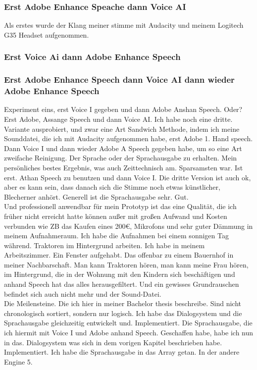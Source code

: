 \documentclass[10pt,a4paper,bibliography=totocnumbered,listof=totocnumbered]{scrartcl}
\begin{document}
\subsubsection{Erst Adobe Enhance Speache dann Voice AI}
Als erstes wurde der Klang meiner stimme mit Audacity und meinem Logitech G35 Headset aufgenommen.
\subsubsection{Erst Voice Ai dann Adobe Enhance Speech}
\subsubsection{Erst Adobe Enhance Speech dann Voice AI dann wieder Adobe Enhance Speech}
 
Experiment eins, erst Voice I gegeben und dann Adobe Anshan Speech. 		 Oder? Erst Adobe, Assange Speech und dann Voice AI.  Ich habe noch eine dritte.
\\
Variante ausprobiert, und zwar eine Art Sandwich Methode, indem ich meine Sounddatei, die ich mit Audacity aufgenommen habe, erst Adobe 1. Hand speech. Dann Voice I und dann wieder Adobe A Speech gegeben habe, um so eine Art zweifache Reinigung. Der Sprache oder der Sprachausgabe zu erhalten.     Mein persönliches bestes Ergebnis, was auch Zeittechnisch am. Sparsamsten war.  Ist erst.  Athan Speech zu benutzen und dann Voice I. Die dritte Version ist auch ok, aber es kann sein, dass danach sich die Stimme noch etwas künstlicher, Blecherner anhört.   Generell ist die Sprachausgabe sehr.  Gut.
\\
Und professionell anwendbar für mein Prototyp ist das eine Qualität, die ich früher nicht erreicht hatte können außer mit großen Aufwand und Kosten verbunden wie ZB das Kaufen eines 200€, Mikrofons und sehr guter Dämmung in meinem Aufnahmeraum. Ich habe die Aufnahmen bei einem sonnigen Tag während. Traktoren im Hintergrund arbeiten. Ich habe in meinem Arbeitszimmer. Ein Fenster aufgehabt. Das offenbar zu einem Bauernhof in meiner Nachbarschaft. Man kann Traktoren hören, man kann meine Frau hören, im Hintergrund, die in der Wohnung mit den Kindern sich beschäftigen und anhand Speech hat das alles herausgefiltert. Und ein gewisses Grundrauschen befindet sich auch nicht mehr und der Sound-Datei.
\\
Die Meilensteine.  Die ich hier in meiner Bachelor thesis beschreibe.  Sind nicht chronologisch sortiert, sondern nur logisch.  Ich habe das Dialogsystem und die Sprachausgabe gleichzeitig entwickelt und.  Implementiert.  Die Sprachausgabe, die ich hiermit mit Voice I und Adobe anhand Speech. Geschaffen habe, habe ich nun in das.  Dialogsystem was sich in dem vorigen Kapitel beschrieben habe. Implementiert. Ich habe die Sprachausgabe in das Array getan.		 In der andere Engine 5.
 
\end{document}
